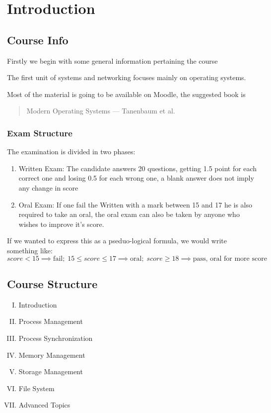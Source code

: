 \documentclass[openright, twoside]{report}
\theoremstyle{definition}
\theoremstyle{example}
\begin{document}
	\section{Introduction}
	\subsection{Course Info}
	Firstly we begin with some general information pertaining the course

	The first unit of systems and networking focuses mainly on operating systems.

	Most of the material is going to be available on Moodle, the suggested book is
	\begin{quote}
		Modern Operating Systems --- Tanenbaum et al.
	\end{quote}


	\subsubsection{Exam Structure}

	The examination is divided in two phases:

	\begin{enumerate}
		\item Written Exam:
		The candidate answers 20 questions, getting 1.5 point for each correct one and losing 0.5 for each wrong one, a blank answer does not imply any change in score
		\item Oral Exam: 
		If one fail the Written with a mark between 15 and 17 he is also required to take an oral, the oral exam can also be taken by anyone who wishes to improve it's score.
	\end{enumerate}

	If we wanted to express this as a pseduo-logical formula, we would write something like:
	\[ score < 15 \implies \text{fail}; \; 15 \leq score \leq 17 \implies \text{oral}; \; score \geq 18 \implies \text{pass, oral for more score} \]

	\subsection{Course Structure}
	\begin{enumerate}[I.]
		\item Introduction
		\item Process Management
		\item Process Synchronization
		\item Memory Management
		\item Storage Management
		\item File System
		\item Advanced Topics
	\end{enumerate}
\end{document}
